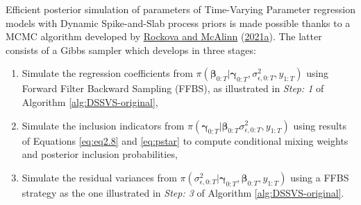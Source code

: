 \documentclass[
  12pt,
]{book}
\theoremstyle{break}
\theoremstyle{nonumberplain}
\begin{document}
Efficient posterior simulation of parameters of Time-Varying Parameter
regression models with Dynamic Spike-and-Slab process priors is made
possible thanks to a MCMC algorithm developed by
\protect\hyperlink{ref-rockova_mcalinn_2021}{Rockova and McAlinn}
(\protect\hyperlink{ref-rockova_mcalinn_2021}{2021a}). The latter
consists of a Gibbs sampler which develops in three stages:

\begin{enumerate}
\item Simulate the regression coefficients from $\pi(\boldsymbol{\beta}_{0:T}|\boldsymbol{\gamma}_{0:T},\sigma^{2}_{\epsilon,0:T},y_{1:T})$ using Forward Filter Backward Sampling (FFBS), as illustrated in \emph{Step: 1} of Algorithm \ref{alg:DSSVS-original},
\item Simulate the inclusion indicators from $\pi(\boldsymbol{\gamma}_{0:T}|\boldsymbol{\beta}_{0:T}\sigma^{2}_{\epsilon,0:T},y_{1:T})$ using results of Equations \ref{eq:eq2.8} and \ref{eq:pstar} to compute conditional mixing weights and posterior inclusion probabilities,
\item Simulate the residual variances from $\pi(\sigma^{2}_{\epsilon,0:T}|\boldsymbol{\gamma}_{0:T},\boldsymbol{\beta}_{0:T},y_{1:T})$ using a FFBS strategy as the one illustrated in \emph{Step: 3} of Algorithm \ref{alg:DSSVS-original}.
\end{enumerate}
\end{document}
